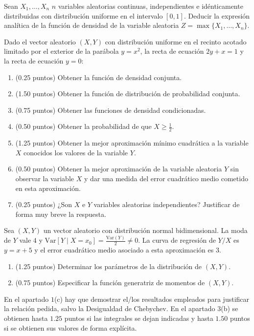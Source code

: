 \documentclass[12pt]{article}
\begin{document}
    \begin{ejercicio}[1.5 puntos]
        Sean $X_1, \dots, X_n$ $n$ variables aleatorias continuas, independientes e idénticamente distribuidas con distribución uniforme en el intervalo $[0,1]$. Deducir la expresión analítica de la función de densidad de la variable aleatoria $Z = \max\{X_1, \dots, X_n\}$.
    \end{ejercicio}

    \begin{ejercicio}[5 puntos]
        Dado el vector aleatorio $(X, Y)$ con distribución uniforme en el recinto acotado limitado por el exterior de la parábola $y = x^2$, la recta de ecuación $2y + x = 1$ y la recta de ecuación $y = 0$:
        \begin{enumerate}[label=(\alph*)]
            \item (0.25 puntos) Obtener la función de densidad conjunta.
            \item (1.50 puntos) Obtener la función de distribución de probabilidad conjunta.
            \item (0.75 puntos) Obtener las funciones de densidad condicionadas.
            \item (0.50 puntos) Obtener la probabilidad de que $X \geq \frac{1}{2}$.
            \item (1.25 puntos) Obtener la mejor aproximación mínimo cuadrática a la variable $X$ conocidos los valores de la variable $Y$.
            \item (0.50 puntos) Obtener la mejor aproximación de la variable aleatoria $Y$ sin observar la variable $X$ y dar una medida del error cuadrático medio cometido en esta aproximación.
            \item (0.25 puntos) ¿Son $X$ e $Y$ variables aleatorias independientes? Justificar de forma muy breve la respuesta.
        \end{enumerate}
    \end{ejercicio}

    \begin{ejercicio}[2 puntos]
        Sea $(X, Y)$ un vector aleatorio con distribución normal bidimensional. La moda de $Y$ vale $4$ y $\mathrm{Var}[Y \mid X = x_0] = \frac{\mathrm{Var}(Y)}{2} \neq 0$. La curva de regresión de $Y/X$ es $y = x + 5$ y el error cuadrático medio asociado a esta aproximación es $3$.
        \begin{enumerate}[label=(\alph*)]
            \item (1.25 puntos) Determinar los parámetros de la distribución de $(X, Y)$.
            \item (0.75 puntos) Especificar la función generatriz de momentos de $(X, Y)$.
        \end{enumerate}
    \end{ejercicio}

    \begin{observacion}
        En el apartado $1$(c) hay que demostrar el/los resultados empleados para justificar la relación pedida, salvo la Desigualdad de Chebychev.
        En el apartado $3$(b) se obtienen hasta $1.25$ puntos si las integrales se dejan indicadas y hasta $1.50$ puntos si se obtienen sus valores de forma explícita.
    \end{observacion}
\end{document}
